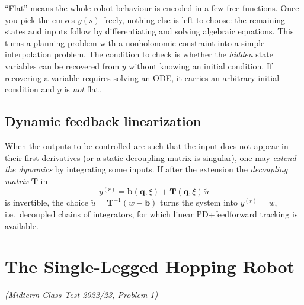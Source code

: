 \documentclass[11pt,a4paper]{article}
\theoremstyle{definition}
\theoremstyle{plain}
\theoremstyle{remark}
\newcommand{\q}{\boldsymbol{q}}
\newcommand{\Tm}{\boldsymbol{T}}
\newcommand{\bb}{\boldsymbol{b}}
\begin{document}
\begin{intuition}
``Flat'' means the whole robot behaviour is encoded in a few free functions. Once you pick the curves $y(s)$ freely, nothing else is left to choose: the remaining states and inputs follow by differentiating and solving algebraic equations. This turns a planning problem with a nonholonomic constraint into a simple interpolation problem. The condition to check is whether the \emph{hidden} state variables can be recovered from $y$ without knowing an initial condition. If recovering a variable requires solving an ODE, it carries an arbitrary initial condition and $y$ is \emph{not} flat.
\end{intuition}

\subsection{Dynamic feedback linearization}

When the outputs to be controlled are such that the input does not appear in their first derivatives (or a static decoupling matrix is singular), one may \emph{extend the dynamics} by integrating some inputs. If after the extension the \emph{decoupling matrix} $\Tm$ in
\begin{equation}
  y^{(r)} = \bb(\q,\xi)+\Tm(\q,\xi)\,\tilde u
\end{equation}
is invertible, the choice $\tilde u=\Tm^{-1}(w-\bb)$ turns the system into $y^{(r)}=w$, i.e.\ decoupled chains of integrators, for which linear PD+feedforward tracking is available.

\section{The Single-Legged Hopping Robot}
\label{sec:hopper}
\emph{(Midterm Class Test 2022/23, Problem 1)}
\end{document}
